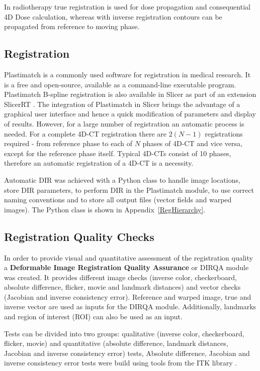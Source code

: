 In radiotherapy true registration is used for dose propagation and consequential 4D Dose calculation, whereas with inverse registration contours can be propagated from reference to moving phase.

\subsection{Registration}
\label{RegistrationImplement}

Plastimatch \cite{Shackleford2010} is a commonly used software for registration in medical research. It is a free and open-source, available as a command-line executable program. 
Plastimatch B-spline registration is also available in Slicer as part of an extension SlicerRT \cite{Pinter2012}.
The integration of Plastimatch in Slicer brings the advantage of a graphical user interface and hence a quick modification of parameters and display of results. 
However, for a large number of registration an automatic process is needed. For a complete 4D-CT registration there are $2(N-1)$ registrations required - from reference phase to each of $N$ phases of 4D-CT and vice versa, except for the reference phase itself. 
Typical 4D-CTs consist of 10 phases, therefore an automatic registration of a 4D-CT is a necessity.

Automatic DIR was achieved with a Python class to handle image locations, store DIR parameters, to perform DIR in the Plastimatch module, to use correct naming conventions and to store all output files (vector fields and warped images). 
The Python class is shown in Appendix~\ref{RegHierarchy}.


\subsection{Registration Quality Checks}
\label{DIRQA}

In order to provide visual and quantitative assessment of the registration quality a \textbf{Deformable Image Registration Quality Assurance} or DIRQA module was created. 
It provides different image checks (inverse color, checkerboard, absolute difference, flicker, movie and landmark distances) 
and vector checks (Jacobian and inverse consistency error). 
Reference and warped image, true and inverse vector are used as inputs for the DIRQA module. 
Additionally, landmarks and region of interest (ROI) can also be used as an input.

Tests can be divided into two groups: qualitative (inverse color, checkerboard, flicker, movie) and quantitative 
(absolute difference, landmark distances, Jacobian and inverse consistency error) tests, Absolute difference, Jacobian and inverse consistency error tests
were build using tools from the ITK library \cite{Yoo2002}.


